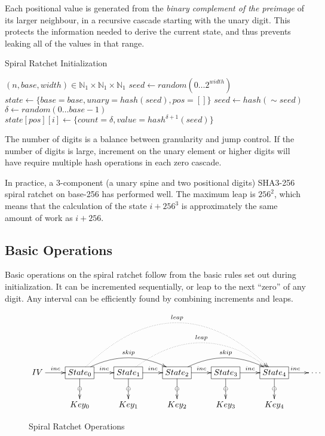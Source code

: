 \documentclass{article}
\begin{document}
	Each positional value is generated from the \emph{binary complement of the preimage} of its larger neighbour, in a recursive cascade starting with the unary digit. This protects the information needed to derive the current state, and thus prevents leaking all of the values in that range.
		
	\begin{algorithm}
		\caption{Spiral Ratchet Initialization}
		\label{alg:setup}

		\begin{algorithmic}[1]
			\Require $(n, base, width) \in \mathbb{N}_{1}\times{\mathbb{N}_{1}\times{\mathbb{N}_{1}}}$
			\State $seed \gets random(0\ldots{2^{width}})$
			\State $state \gets \lbrace base = base, unary = hash(seed), pos = [] \rbrace$
			 
				\State $seed \gets hash(\sim{seed})$ 
				\State $\delta \gets random(0\ldots{base - 1})$
				\State $state[pos][i] \gets \{count = \delta, value = hash^{\delta + 1}(seed)\rbrace$
			\EndFor
			\\
		\end{algorithmic}
	\end{algorithm}

	The number of digits is a balance between granularity and jump control. If the number of digits is large, increment on the unary element or higher digits will have require multiple hash operations in each zero cascade.
	
	In practice, a 3-component (a unary spine and two positional digits) SHA3-256 spiral ratchet on base-256 has performed well. The maximum leap is $256^{2}$, which means that the calculation of the state $i + 256^{3}$ is approximately the same amount of work as $i + 256$.

	\subsection{Basic Operations}
	
	Basic operations on the spiral ratchet follow from the basic rules set out during initialization. It can be incremented sequentially, or leap to the next ``zero'' of any digit. Any interval can be efficiently found by combining increments and leaps.
	
	\begin{figure}[h]
		\centering
		
		$\xymatrix{
			IV \ar[r]^<<<<<{inc} 
				& *+[F]{State_{0}}
					\ar[d]|\oplus
					\ar[r]^{inc}
					\ar@/^1.5pc/[rr]^{skip}
					\ar@{.>}@/^5pc/[rrrr]^{leap}
				& *+[F]{State_{1}}
					\ar[d]|\oplus
					\ar[r]^{inc}
					\ar@{.>}@/^3pc/[rrr]^{leap}
				& *+[F]{State_{2}} 
					\ar[d]|\oplus
					\ar[r]^{inc}
					\ar@/^1.5pc/[rr]^{skip}
				& *+[F]{State_{3}}
					\ar[d]|\oplus
					\ar[r]^{inc}
				& *+[F]{State_{4}}
					\ar[d]|\oplus
					\ar[r]^{inc}
				& \cdots
			\\
				& Key_{0}
				& Key_{1}
				& Key_{2}
				& Key_{3}
				& Key_{4}
		}$
		
		\caption{Spiral Ratchet Operations}
	\end{figure}
\end{document}
